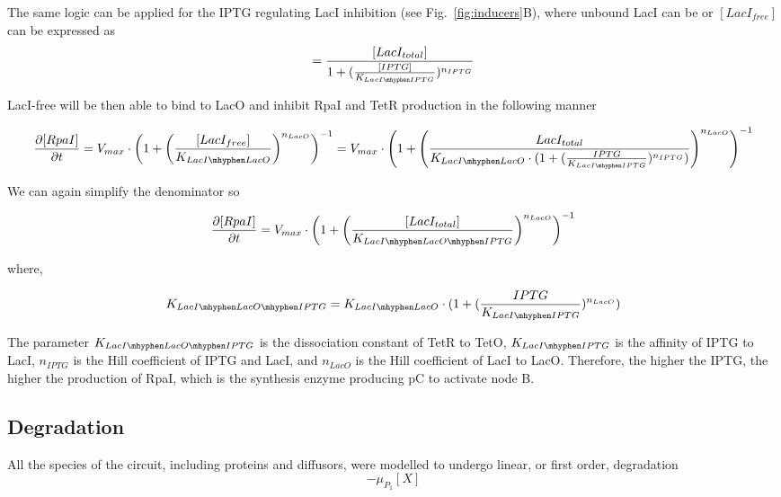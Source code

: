 The same logic can be applied for the IPTG regulating LacI inhibition (see Fig.~\ref{fig:inducers}B),
where unbound LacI can be or $[LacI_{free}]$ can be expressed as
\begin{equation}
[LacI{free}] =  \frac{[LacI_{total}]}{1+(\frac{[IPTG]}{K_{LacI \mhyphen IPTG}})^{n_{IPTG}}}
\end{equation}

LacI-free will be then able to bind to LacO and inhibit RpaI and TetR production in the following manner

\begin{equation}
    \pdv{[RpaI]}{t} = V_{max}\cdot \left(1+\left(\frac{[LacI_{free}]}{K_{LacI \mhyphen LacO}}\right)^{n_{LacO}}\right)^{-1} = V_{max} \cdot \left(1+\left(\frac{LacI_{total}}{K_{LacI \mhyphen LacO}\cdot(1+(\frac{IPTG}{K_{LacI \mhyphen IPTG}})^{n_{IPTG}})}\right)^{n_{LacO}}\right)^{-1}
\end{equation}


We can again simplify the denominator so

\begin{equation}
    \pdv{[RpaI]}{t} = V_{max}\cdot \left(1+\left(\frac{[LacI_{total}]}{K_{LacI \mhyphen LacO \mhyphen IPTG }}\right)^{n_{LacO}}\right)^{-1}
\end{equation}

where,

\begin{equation}
    K_{LacI \mhyphen LacO \mhyphen IPTG} = K_{LacI \mhyphen LacO}\cdot(1+(\frac{IPTG}{K_{LacI \mhyphen IPTG}})^{n_{LacO}})
\end{equation}

The parameter $K_{LacI \mhyphen LacO \mhyphen IPTG}$ is the dissociation constant of TetR to TetO, $K_{LacI \mhyphen IPTG}$
is the affinity of IPTG to LacI, $n_{IPTG}$ is the Hill coefficient of IPTG and LacI,
and $n_{LacO}$ is the Hill coefficient of LacI to LacO.
Therefore, the higher the IPTG, the higher the production of RpaI, which is the synthesis enzyme producing pC to activate node B.




\subsection{Degradation}
All the species of the circuit, including proteins and diffusors,
were modelled to undergo linear, or first order, degradation
\begin{equation}
    -\mu_{P_{1}}[X]
    \label{linear degradation}
\end{equation}


